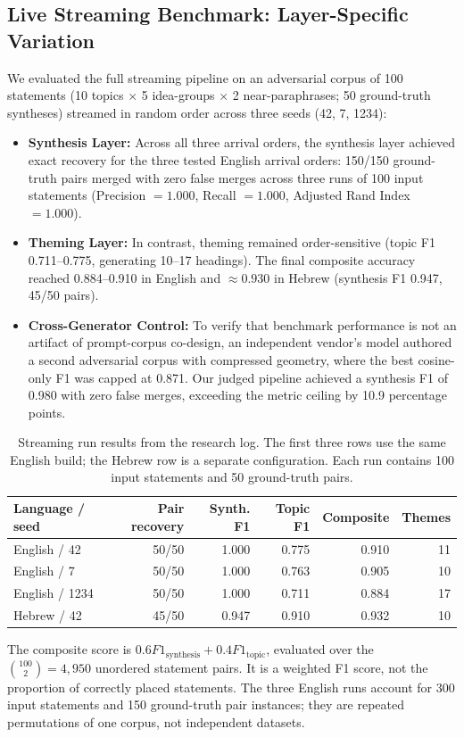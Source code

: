 \documentclass[11pt,a4paper]{article}
\begin{document}
\subsection{Live Streaming Benchmark: Layer-Specific Variation}

We evaluated the full streaming pipeline on an adversarial corpus of 100 statements (10 topics $\times$ 5 idea-groups $\times$ 2 near-paraphrases; 50 ground-truth syntheses) streamed in random order across three seeds (42, 7, 1234):

\begin{itemize}
\item \textbf{Synthesis Layer:} Across all three arrival orders, the synthesis layer achieved exact recovery for the three tested English arrival orders: 150/150 ground-truth pairs merged with zero false merges across three runs of 100 input statements (Precision $=1.000$, Recall $=1.000$, Adjusted Rand Index $=1.000$).
\item \textbf{Theming Layer:} In contrast, theming remained order-sensitive (topic F1 0.711--0.775, generating 10--17 headings). The final composite accuracy reached 0.884--0.910 in English and $\approx 0.930$ in Hebrew (synthesis F1 0.947, 45/50 pairs).
\item \textbf{Cross-Generator Control:} To verify that benchmark performance is not an artifact of prompt-corpus co-design, an independent vendor's model authored a second adversarial corpus with compressed geometry, where the best cosine-only F1 was capped at 0.871. Our judged pipeline achieved a synthesis F1 of 0.980 with zero false merges, exceeding the metric ceiling by 10.9 percentage points.
\end{itemize}


\begin{table}[htbp]
\centering\small
\caption{Streaming run results from the research log. The first three rows use the same English build; the Hebrew row is a separate configuration. Each run contains 100 input statements and 50 ground-truth pairs.}
\label{tab:stream}
\begin{tabular}{@{}lrrrrr@{}}
\toprule
Language / seed & Pair recovery & Synth. F1 & Topic F1 & Composite & Themes \\
\midrule
English / 42 & 50/50 & 1.000 & 0.775 & 0.910 & 11 \\
English / 7 & 50/50 & 1.000 & 0.763 & 0.905 & 10 \\
English / 1234 & 50/50 & 1.000 & 0.711 & 0.884 & 17 \\
Hebrew / 42 & 45/50 & 0.947 & 0.910 & 0.932 & 10 \\
\bottomrule
\end{tabular}
\end{table}
The composite score is $0.6F1_{\mathrm{synthesis}}+0.4F1_{\mathrm{topic}}$, evaluated over the $\binom{100}{2}=4{,}950$ unordered statement pairs. It is a weighted F1 score, not the proportion of correctly placed statements. The three English runs account for 300 input statements and 150 ground-truth pair instances; they are repeated permutations of one corpus, not independent datasets.
\end{document}
